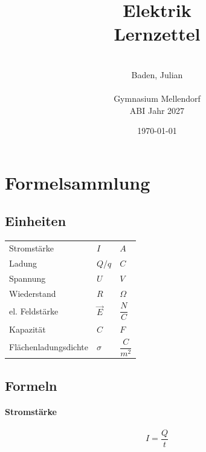 \documentclass[a4paper]{article}
\title{\Huge{Elektrik\\Lernzettel}}
\date{\today}
\author{\quad\\Baden, Julian\\\quad\\Gymnasium Mellendorf\\ABI Jahr 2027}
\begin{document}
\maketitle
\thispagestyle{empty}
\newpage
\tableofcontents \thispagestyle{empty}
\newpage
{}


\section{Formelsammlung}
\subsection{Einheiten}

\begin{center}
    \begin{tabular}{ p{4cm} p{4cm} p{4cm} }
         Stromstärke            & $I$           & $A$                 \\[0,5cm]
         Ladung                 & $Q / q$  		& $C$ 			      \\[0,5cm]
         Spannung               & $U$           & $V$                 \\[0,5cm]
         Wiederstand            & $R$           & $\Omega$            \\[0,5cm]
         el. Feldstärke         & $\vec{E}$     & $\dfrac{N}{C}$      \\[0,5cm]
         Kapazität              & $C$           & $F$                 \\[0,5cm]
         Flächenladungsdichte   & $\sigma$      & $\dfrac{C}{m^2}$    \\[1cm]
    \end{tabular}
\end{center}





\subsection{Formeln}









\paragraph{Stromstärke}
\large$$I = \dfrac{Q}{t}$$\normalsize
\end{document}
